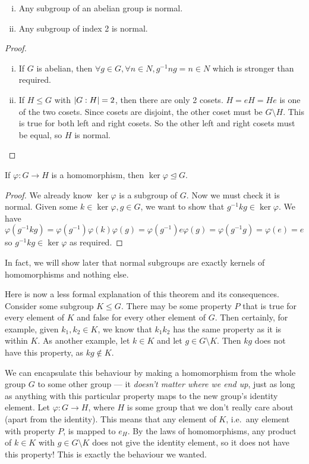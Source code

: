 \begin{proposition}
	\begin{enumerate}[(i)]
		\item Any subgroup of an abelian group is normal.
		\item Any subgroup of index 2 is normal.
	\end{enumerate}
\end{proposition}
\begin{proof}
	\begin{enumerate}[(i)]
		\item If \(G\) is abelian, then \(\forall g \in G, \forall n \in N, g^{-1}ng = n \in N\) which is stronger than required.
		\item If \(H \leq G\) with \(\abs{G : H} = 2\), then there are only 2 cosets.
		      \(H = eH = He\) is one of the two cosets.
		      Since cosets are disjoint, the other coset must be \(G \setminus H\).
		      This is true for both left and right cosets.
		      So the other left and right cosets must be equal, so \(H\) is normal.
	\end{enumerate}
\end{proof}

\begin{proposition}
	If \(\varphi: G \to H\) is a homomorphism, then \(\ker \varphi \trianglelefteq G\).
\end{proposition}
\begin{proof}
	We already know \(\ker \varphi\) is a subgroup of \(G\).
	Now we must check it is normal.
	Given some \(k \in \ker \varphi, g \in G\), we want to show that \(g^{-1} k g \in \ker \varphi\).
	We have \(\varphi(g^{-1} k g) = \varphi(g^{-1}) \varphi(k) \varphi(g) = \varphi(g^{-1}) e \varphi(g) = \varphi(g^{-1}g) = \varphi(e) = e\) so \(g^{-1} k g \in \ker \varphi\) as required.
\end{proof}
In fact, we will show later that normal subgroups are exactly kernels of homomorphisms and nothing else.

Here is now a less formal explanation of this theorem and its consequences.
Consider some subgroup \(K \leq G\).
There may be some property \(P\) that is true for every element of \(K\) and false for every other element of \(G\).
Then certainly, for example, given \(k_1, k_2 \in K\), we know that \(k_1k_2\) has the same property as it is within \(K\).
As another example, let \(k \in K\) and let \(g \in G \setminus K\).
Then \(kg\) does not have this property, as \(kg \notin K\).

We can encapsulate this behaviour by making a homomorphism from the whole group \(G\) to some other group --- it \textit{doesn't matter where we end up}, just as long as anything with this particular property maps to the new group's identity element.
Let \(\varphi: G \to H\), where \(H\) is some group that we don't really care about (apart from the identity).
This means that any element of \(K\), i.e.\ any element with property \(P\), is mapped to \(e_H\).
By the laws of homomorphisms, any product of \(k \in K\) with \(g \in G \setminus K\) does not give the identity element, so it does not have this property! This is exactly the behaviour we wanted.

